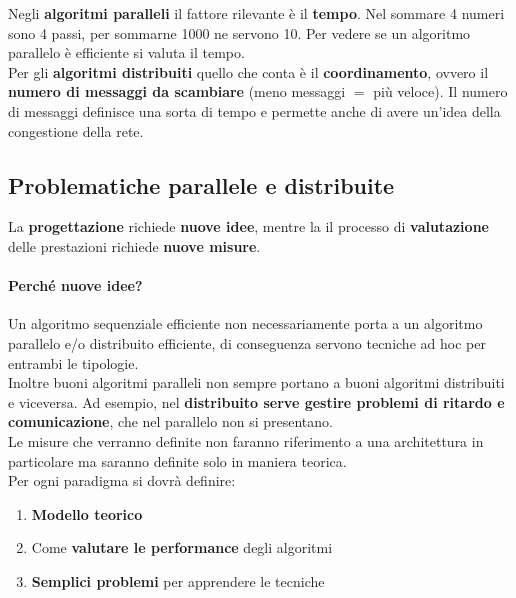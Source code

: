 \documentclass[11pt]{article}
\begin{document}
	Negli \textbf{algoritmi paralleli} il fattore rilevante è il \textbf{tempo}. Nel sommare 4 numeri sono 4 passi, per sommarne 1000 ne servono 10. Per vedere se un algoritmo parallelo è efficiente si valuta il tempo. \\
	
	Per gli \textbf{algoritmi distribuiti} quello che conta è il \textbf{coordinamento}, ovvero il \textbf{numero di messaggi da scambiare} (meno messaggi $=$ più veloce). Il numero di messaggi definisce una sorta di tempo e permette anche di avere un'idea della congestione della rete. \\

	
	\subsection*{Problematiche parallele e distribuite}
	
	La \textbf{progettazione} richiede \textbf{nuove idee}, mentre la il processo di \textbf{valutazione} delle prestazioni richiede \textbf{nuove misure}.\\
	
	\paragraph{Perché nuove idee?} Un algoritmo sequenziale efficiente non necessariamente porta a un algoritmo parallelo e/o distribuito efficiente, di conseguenza servono tecniche ad hoc per entrambi le tipologie.\\
	
	Inoltre buoni algoritmi paralleli non sempre portano a buoni algoritmi distribuiti e viceversa. Ad esempio, nel \textbf{distribuito serve gestire problemi di ritardo e comunicazione}, che nel parallelo non si presentano.\\
	
	Le misure che verranno definite non faranno riferimento a una architettura in particolare ma saranno definite solo in maniera teorica.\\
	
	Per ogni paradigma si dovrà definire: 
	\begin{enumerate}
		\item \textbf{Modello teorico}
		\item Come \textbf{valutare le performance} degli algoritmi
		\item \textbf{Semplici problemi} per apprendere le tecniche
	\end{enumerate}
	
\end{document}
